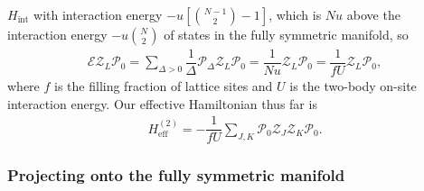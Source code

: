 \documentclass[nofootinbib,notitlepage,11pt]{revtex4-2}
\renewcommand{\t}{\text} %
\newcommand{\f}[2]{\dfrac{#1}{#2}} %
\renewcommand{\sp}[1]{\left[#1\right]} %
\newcommand{\1}{\mathds{1}}
\newcommand{\E}{\mathcal{E}}
\renewcommand{\P}{\mathcal{P}}
\newcommand{\Z}{\mathcal{Z}}
\begin{document}
$H_{\t{int}}$ with interaction energy $-u\sp{{ N-1 \choose 2 } - 1}$,
which is $Nu$ above the interaction energy $-u{N\choose2}$ of states
in the fully symmetric manifold, so
\begin{align}
  \E \Z_L \P_0
  = \sum_{\Delta>0} \f1{\Delta} \P_\Delta \Z_L \P_0
  =  \f1{Nu} \Z_L \P_0
  = \f1{fU} \Z_L \P_0,
  \label{eq:proj_elim}
\end{align}
where $f$ is the filling fraction of lattice sites and $U$ is the
two-body on-site interaction energy.  Our effective Hamiltonian thus
far is
\begin{align}
  H_{\t{eff}}^{(2)}
  = - \f1{fU} \sum_{J,K} \P_0 \Z_J \Z_K \P_0.
  \label{eq:H_eff_2_mid}
\end{align}

\subsubsection{Projecting onto the fully symmetric manifold}
\end{document}
